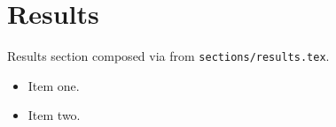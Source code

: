 \section{Results}
Results section composed via \verb|| from \texttt{sections/results.tex}.
\begin{itemize}
\item Item one.
\item Item two.
\end{itemize}
